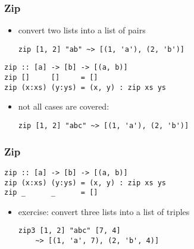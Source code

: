 \documentclass[dvipsnames]{beamer}
\theoremstyle{plain}
\begin{document}
\begin{frame}[fragile]
  \frametitle{Zip}

  \begin{itemize}
    \item convert two lists into a list of pairs
    \begin{lstlisting}[frame=none]
zip [1, 2] "ab" ~> [(1, 'a'), (2, 'b')]
    \end{lstlisting}
  \end{itemize}

  \pause
  \begin{exampleblock}{}
    \begin{lstlisting}[deletekeywords={zip}]
zip :: [a] -> [b] -> [(a, b)]
zip []     []     = []
zip (x:xs) (y:ys) = (x, y) : zip xs ys
    \end{lstlisting}
  \end{exampleblock}

  \pause
  \begin{itemize}
    \item not all cases are covered:
    \begin{lstlisting}[deletekeywords={zip}, frame=none]
zip [1, 2] "abc" ~> [(1, 'a'), (2, 'b')]
    \end{lstlisting}
  \end{itemize}
\end{frame}

\begin{frame}[fragile]
  \frametitle{Zip}

  \begin{exampleblock}{}
    \begin{lstlisting}[deletekeywords={zip}]
zip :: [a] -> [b] -> [(a, b)]
zip (x:xs) (y:ys) = (x, y) : zip xs ys
zip _      _      = []
    \end{lstlisting}
  \end{exampleblock}

  \pause
  \begin{itemize}
    \item exercise: convert three lists into a list of triples
    \begin{lstlisting}[frame=none]
zip3 [1, 2] "abc" [7, 4]
    ~> [(1, 'a', 7), (2, 'b', 4)]
    \end{lstlisting}
  \end{itemize}
\end{frame}
\end{document}
